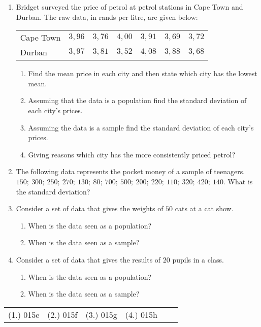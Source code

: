{
\begin{enumerate}
\item Bridget surveyed the price of petrol at petrol stations in Cape Town and Durban. The raw data, in rands per litre, are given below:
\begin{center}
\begin{tabular}{lllllll}
Cape Town & $3,96$ & $3,76$ & $4,00$ & $3,91$ & $3,69$ & $3,72$ \\
Durban    & $3,97$ & $3,81$ & $3,52$ & $4,08$ & $3,88$ & $3,68$ \\ 
\end{tabular}
\end{center}
	\begin{enumerate}
	\item Find the mean price in each city and then state which city has the lowest mean.
	\item Assuming that the data is a population find the standard deviation of each city's prices.
	\item Assuming the data is a sample find the standard deviation of each city's prices.
	\item Giving reasons which city has the more consistently priced petrol?
	\end{enumerate}
\item The following data represents the pocket money of a sample of teenagers. \newline
$150; ~300;~ 250;~ 270;~ 130;~ 80;~ 700;~ 500;~ 200;~ 220;~ 110;~ 320;~ 420;~ 140$. \newline
What is the standard deviation?
\item Consider a set of data that gives the weights of $50$ cats at a cat show.
	\begin{enumerate}
	\item When is the data seen as a population?
	\item When is the data seen as a sample?
	\end{enumerate}
\item Consider a set of data that gives the results of $20$ pupils in a class.
	\begin{enumerate}
	\item When is the data seen as a population?
	\item When is the data seen as a sample?
	\end{enumerate}  
\end{enumerate}



\par \practiceinfo
\par \begin{tabular}[h]{cccccc}
(1.)	015e	&
(2.)	015f	&
(3.)	015g	&
(4.)	015h	&
\end{tabular}}

